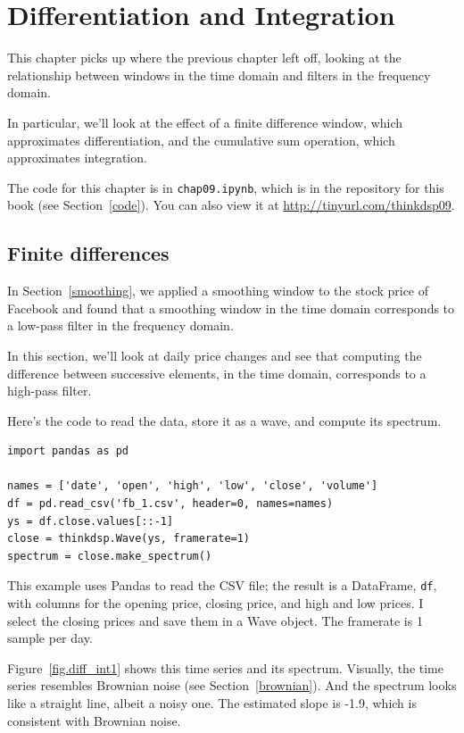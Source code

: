 \documentclass[12pt]{book}
\begin{document}
\chapter{Differentiation and Integration}
\label{diffint}

This chapter picks up where the previous chapter left off,
looking at the relationship between windows in the time domain
and filters in the frequency domain.

In particular, we'll look at the effect of a finite difference
window, which approximates differentiation, and the cumulative
sum operation, which approximates integration.

The code for this chapter is in {\tt chap09.ipynb}, which is in the
repository for this book (see Section~\ref{code}).
You can also view it at \url{http://tinyurl.com/thinkdsp09}.


\section{Finite differences}
\label{diffs}

In Section~\ref{smoothing}, we applied a smoothing window to
the stock price of Facebook and found that a smoothing
window in the time domain corresponds to a low-pass filter in
the frequency domain.

In this section, we'll look at daily price changes and
see that computing the difference between successive elements,
in the time domain, corresponds to a high-pass filter.

Here's the code to read the data, store it as a wave, and compute its
spectrum.

\begin{verbatim}
import pandas as pd

names = ['date', 'open', 'high', 'low', 'close', 'volume']
df = pd.read_csv('fb_1.csv', header=0, names=names)
ys = df.close.values[::-1]
close = thinkdsp.Wave(ys, framerate=1)
spectrum = close.make_spectrum()
\end{verbatim}

This example uses Pandas to read the CSV file; the
result is a DataFrame, {\tt df}, with columns for the opening
price, closing price, and high and low prices.  I select the closing
prices and save them in a Wave object.
The framerate is 1 sample per day.

Figure~\ref{fig.diff_int1} shows
this time series and its spectrum.
Visually, the time series resembles Brownian noise (see
Section~\ref{brownian}).
And the spectrum looks like a straight
line, albeit a noisy one.  The estimated slope is -1.9,
which is consistent with Brownian noise.
\end{document}
